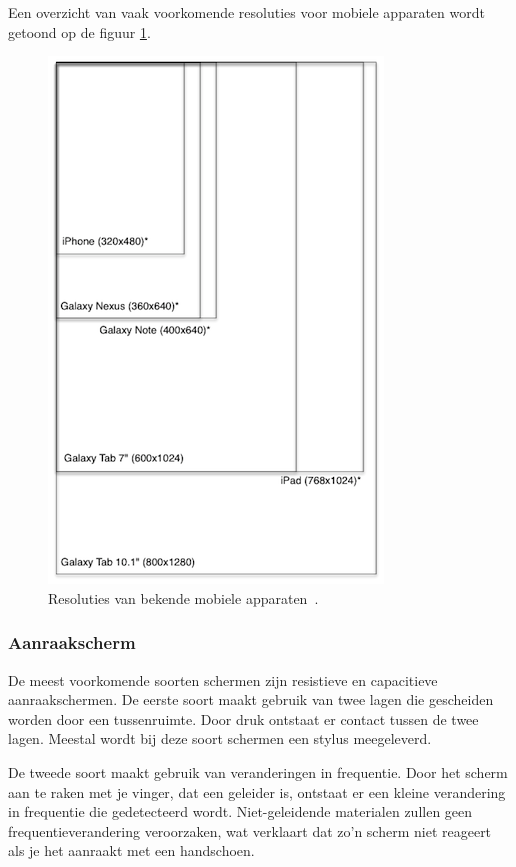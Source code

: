 Een overzicht van vaak voorkomende resoluties voor mobiele apparaten wordt getoond op de figuur \ref{fig:resoluties}.

\begin{figure}
  \centering
  \includegraphics[height=0.8\textwidth]{figuren/mobile-devices-resolutions.png}
  \caption{Resoluties van bekende mobiele apparaten~\cite{Wolfermann2012}.}
  \label{fig:resoluties}
\end{figure}

\subsubsection{Aanraakscherm}
De meest voorkomende soorten schermen zijn resistieve en capacitieve aanraakschermen. De eerste soort maakt gebruik van twee lagen die gescheiden worden door een tussenruimte. Door druk ontstaat er contact tussen de twee lagen. Meestal wordt bij deze soort schermen een stylus meegeleverd. 

De tweede soort maakt gebruik van veranderingen in frequentie. Door het scherm aan te raken met je vinger, dat een geleider is, ontstaat er een kleine verandering in frequentie die gedetecteerd wordt. Niet-geleidende materialen zullen geen frequentieverandering veroorzaken, wat verklaart dat zo'n scherm niet reageert als je het aanraakt met een handschoen.

